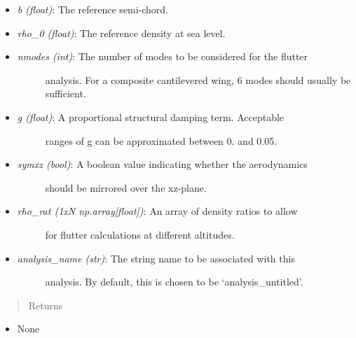 \documentclass[letterpaper,10pt,english]{sphinxmanual}
\begin{document}
\begin{fulllineitems}
\begin{fulllineitems}
\begin{itemize}
\begin{description}
\end{description}

\item {} 
\emph{b (float)}: The reference semi-chord.

\item {} 
\emph{rho\_0 (float)}: The reference density at sea level.

\item {} \begin{description}
\item[{\emph{nmodes (int)}: The number of modes to be considered for the flutter}] \leavevmode
analysis. For a composite cantilevered wing, 6 modes should usually
be sufficient.

\end{description}

\item {} \begin{description}
\item[{\emph{g (float)}: A proportional structural damping term. Acceptable}] \leavevmode
ranges of g can be approximated between 0. and 0.05.

\end{description}

\item {} \begin{description}
\item[{\emph{symxz (bool)}: A boolean value indicating whether the aerodynamics}] \leavevmode
should be mirrored over the xz-plane.

\end{description}

\item {} \begin{description}
\item[{\emph{rho\_rat (1xN np.array{[}float{]})}: An array of density ratios to allow}] \leavevmode
for flutter calculations at different altitudes.

\end{description}

\item {} \begin{description}
\item[{\emph{analysis\_name (str)}: The string name to be associated with this}] \leavevmode
analysis. By default, this is chosen to be `analysis\_untitled'.

\end{description}

\end{itemize}
\begin{quote}\begin{description}
\item[{Returns}] \leavevmode
\end{description}\end{quote}
\begin{itemize}
\item {} 
None


\end{itemize}
\end{fulllineitems}
\end{fulllineitems}
\end{document}
